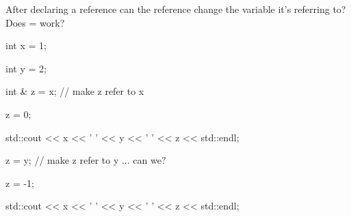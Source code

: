 After declaring a reference can the reference change the variable it's referring to? Does = work?



\begin{consolethree}[escapeinside=||]

int x = 1;

int y = 2;

int & z = x; // make z refer to x

z = 0;

std::cout << x << ' ' << y << ' ' << z << std::endl;



z = y; // make z refer to y ... can we?

z = -1;

std::cout << x << ' ' << y << ' ' << z << std::endl;

\end{consolethree}

